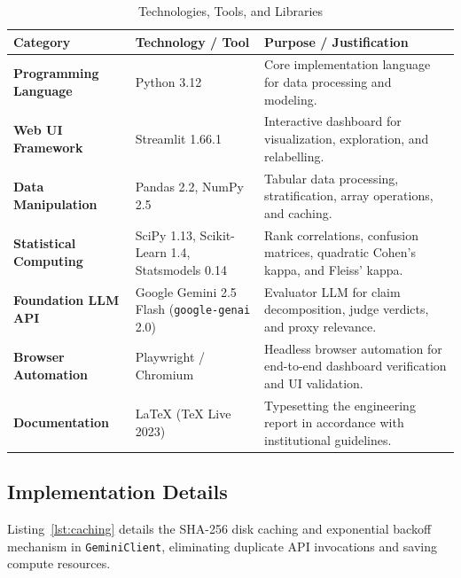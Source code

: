 \documentclass[11pt,a4paper]{article}
\renewcommand{\arraystretch}{1.2}
\begin{document}
\begin{table}[htbp]
\centering
\caption{Technologies, Tools, and Libraries}
\label{tab:tech_stack}
\footnotesize
\renewcommand{\arraystretch}{1.25}
\begin{tabularx}{\linewidth}{|>{\RaggedRight\bfseries}p{3.2cm}|>{\RaggedRight}p{3.8cm}|>{\RaggedRight}X|}
\hline
\rowcolor{tableheader}
Category & Technology / Tool & Purpose / Justification \\
\hline
Programming Language & Python 3.12 & Core implementation language for data processing and modeling. \\
\hline
Web UI Framework & Streamlit 1.66.1 & Interactive dashboard for visualization, exploration, and relabelling. \\
\hline
Data Manipulation & Pandas 2.2, NumPy 2.5 & Tabular data processing, stratification, array operations, and caching. \\
\hline
Statistical Computing & SciPy 1.13, Scikit-Learn 1.4, Statsmodels 0.14 & Rank correlations, confusion matrices, quadratic Cohen's kappa, and Fleiss' kappa. \\
\hline
Foundation LLM API & Google Gemini 2.5 Flash (\texttt{google-genai} 2.0) & Evaluator LLM for claim decomposition, judge verdicts, and proxy relevance. \\
\hline
Browser Automation & Playwright / Chromium & Headless browser automation for end-to-end dashboard verification and UI validation. \\
\hline
Documentation & \LaTeX{} (TeX Live 2023) & Typesetting the engineering report in accordance with institutional guidelines. \\
\hline
\end{tabularx}
\end{table}

\subsection{Implementation Details}
Listing~\ref{lst:caching} details the SHA-256 disk caching and exponential backoff mechanism in \texttt{GeminiClient}, eliminating duplicate API invocations and saving compute resources.
\end{document}
